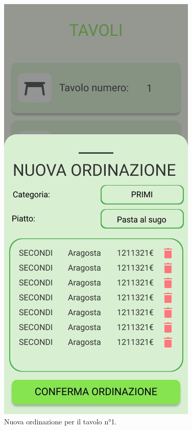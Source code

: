 \begin{figure}[H]
  \centering
  \includegraphics[scale=0.6]{img/mock-up/New_order.png}
  \caption{Nuova ordinazione per il tavolo n°1.}
\end{figure}
\newpage
